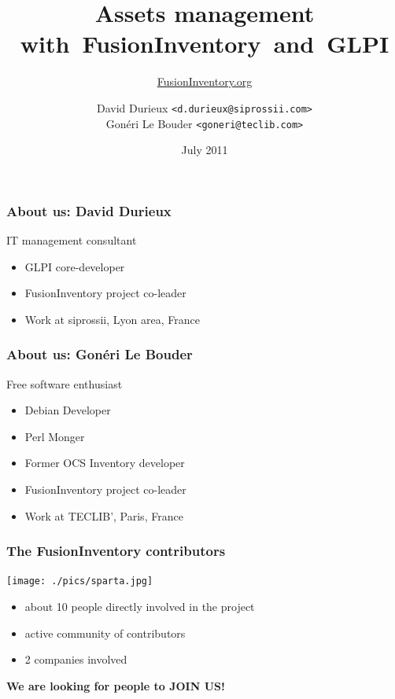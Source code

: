 \documentclass{beamer}
\title{Assets management with~FusionInventory~and~GLPI}
\author{\href{http://www.FusionInventory.org}{FusionInventory.org}}
\date{July 2011}
\institute{\texttt{[image: ./pics/rmll2011.jpg]}}
\author{ David Durieux \texttt{<d.durieux@siprossii.com>} \\
Gonéri Le Bouder \texttt{<goneri@teclib.com>}}
\begin{document}
\frame[plain]{\titlepage}

\begin{frame}
    \frametitle{About us: David Durieux}

    \begin{block}{IT management consultant}
        \begin{itemize}
        \item GLPI core-developer
        \item FusionInventory project co-leader
        \item Work at siprossii, Lyon area, France
        \end{itemize}
    \end{block}

\end{frame}



\begin{frame}
    \frametitle{About us: Gonéri Le Bouder}


    \begin{block}{Free software enthusiast}
        \begin{itemize}
        \item Debian Developer
        \item Perl Monger
        \item Former OCS Inventory developer
        \item FusionInventory project co-leader
        \item Work at TECLIB', Paris, France
        \end{itemize}
    \end{block}

\end{frame}


\begin{frame}
    \frametitle{The FusionInventory contributors}

    \begin{center}
    \texttt{[image: ./pics/sparta.jpg]}
    \end{center}

    \begin{itemize}
    \item about 10 people directly involved in the project
    \item active community of contributors
    \item 2 companies involved
    \end{itemize}

    \pause
    \bf{We are looking for people to JOIN US!}
\end{frame}
\end{document}
